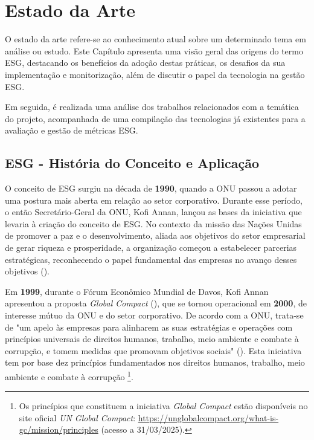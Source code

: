 \chapter{Estado da Arte}
\label{chap:EA}

O estado da arte refere-se ao conhecimento atual sobre um determinado tema em análise ou estudo. Este Capítulo apresenta uma visão geral das origens do termo \gls{ESG}, destacando os benefícios da adoção destas práticas, os desafios da sua implementação e monitorização, além de discutir o papel da tecnologia na gestão \gls{ESG}.

Em seguida, é realizada uma análise dos trabalhos relacionados com a temática do projeto, acompanhada de uma compilação das tecnologias já existentes para a avaliação e gestão de métricas \gls{ESG}.


\section{ESG - História do Conceito e Aplicação} 
\label{sec:OESG} 

O conceito de \gls{ESG} surgiu na década de \textbf{1990}, quando a \gls{ONU} passou a adotar uma postura mais aberta em relação ao setor corporativo. Durante esse período, o então Secretário-Geral da \gls{ONU}, Kofi Annan, lançou as bases da iniciativa que levaria à criação do conceito de \gls{ESG}. No contexto da missão das Nações Unidas de promover a paz e o desenvolvimento, aliada aos objetivos do setor empresarial de gerar riqueza e prosperidade, a organização começou a estabelecer parcerias estratégicas, reconhecendo o papel fundamental das empresas no avanço desses objetivos (\cite{Pollman2024}).

Em \textbf{1999}, durante o Fórum Econômico Mundial de Davos, Kofi Annan apresentou a proposta \textit{Global Compact} (\cite{Pollman2024}), que se tornou operacional em \textbf{2000}, de interesse mútuo da \gls{ONU} e do setor corporativo. De acordo com a \gls{ONU}, trata-se de "um apelo às empresas para alinharem as suas estratégias e operações com princípios universais de direitos humanos, trabalho, meio ambiente e combate à corrupção, e tomem medidas que promovam objetivos sociais" (\cite{ONUGC2025}). Esta iniciativa tem por base dez princípios fundamentados nos direitos humanos, trabalho, meio ambiente e combate à corrupção \footnote{Os princípios que constituem a iniciativa \textit{Global Compact} estão disponíveis no site oficial \textit{UN Global Compact}: \url{https://unglobalcompact.org/what-is-gc/mission/principles} (acesso a 31/03/2025).}.

